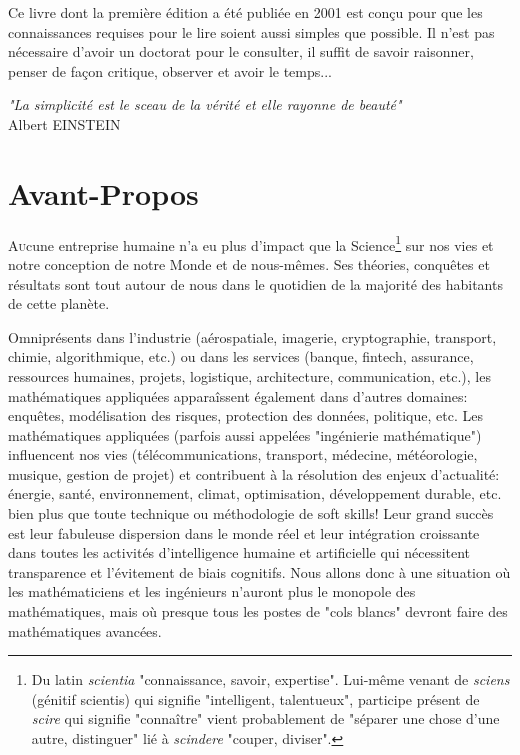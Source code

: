 	\newpage
	\thispagestyle{empty}
	\mbox{}
	Ce livre dont la première \'edition a \'et\'e publi\'ee en 2001 est conçu pour que les connaissances requises pour le lire soient aussi simples que possible. Il n'est pas n\'ecessaire d'avoir un doctorat pour le consulter, il suffit de savoir raisonner, penser de façon critique, observer et avoir le temps...
	\begin{flushright}
	\textit{"La simplicit\'e est le sceau de la v\'erit\'e et elle rayonne de beaut\'e"} \\
	 Albert EINSTEIN
	\end{flushright}
	
	\section{Avant-Propos}
	\lettrine[lines=4]{\color{BrickRed}A}ucune entreprise humaine n'a eu plus d'impact que la Science\footnote{Du latin \textit{scientia} "connaissance, savoir, expertise". Lui-même venant de \textit{sciens} (g\'enitif scientis) qui signifie "intelligent, talentueux", participe pr\'esent de \textit{scire} qui signifie "connaître" vient probablement de "s\'eparer une chose d'une autre, distinguer" li\'e à \textit{scindere} "couper, diviser".} sur nos vies et notre conception de notre Monde et de nous-mêmes. Ses th\'eories, conquêtes et r\'esultats sont tout autour de nous dans le quotidien de la majorit\'e des habitants de cette planète.

	Omnipr\'esents dans l'industrie (a\'erospatiale, imagerie, cryptographie, transport, chimie, algorithmique, etc.) ou dans les services (banque, fintech, assurance, ressources humaines, projets, logistique, architecture, communication, etc.), les math\'ematiques appliqu\'ees apparaîssent \'egalement dans d'autres domaines: enquêtes, mod\'elisation des risques, protection des donn\'ees, politique, etc. Les math\'ematiques appliqu\'ees (parfois aussi appel\'ees "ing\'enierie math\'ematique") influencent nos vies (t\'el\'ecommunications, transport, m\'edecine, m\'et\'eorologie, musique, gestion de projet) et contribuent à la r\'esolution des enjeux d'actualit\'e: \'energie, sant\'e, environnement, climat, optimisation, d\'eveloppement durable, etc. bien plus que toute technique ou m\'ethodologie de soft skills! Leur grand succès est leur fabuleuse dispersion dans le monde r\'eel et leur int\'egration croissante dans toutes les activit\'es d'intelligence humaine et artificielle qui n\'ecessitent transparence et l'\'evitement de biais cognitifs. Nous allons donc à une situation où les math\'ematiciens et les ing\'enieurs n'auront plus le monopole des math\'ematiques, mais où presque tous les postes de "cols blancs" devront faire des math\'ematiques avanc\'ees.

